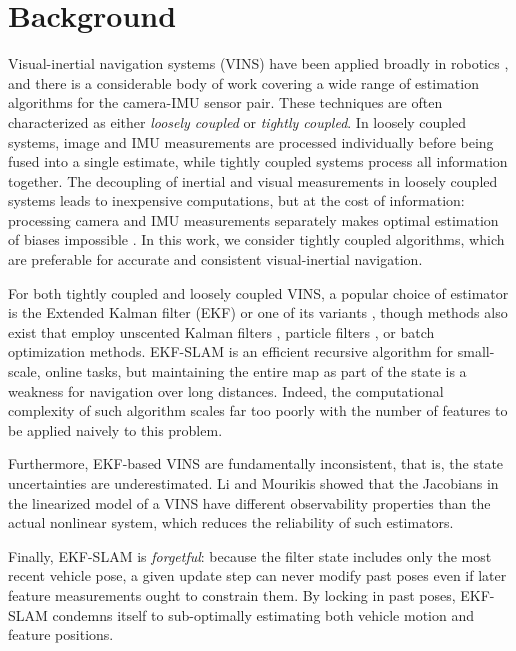 \documentclass[letterpaper, 10 pt, conference]{ieeeconf}  %
\begin{document}
\section{Background} \label{sec:relatedwork}

Visual-inertial navigation systems (VINS) have been applied broadly in robotics \cite{Mourikis:2007:ICRA, Sibley:2010:JFR, Huster:2002:OC, Kottas:2013:IROS, Kim:2007:RSS, Li:2013coa,  You:2001:VR}, and there is a considerable body of work covering a wide range of estimation algorithms for the camera-IMU sensor pair. 
These techniques are often characterized as either \textit{loosely coupled} or \textit{tightly coupled}.
In loosely coupled systems, image and IMU measurements are processed individually before being fused into a single estimate, while tightly coupled systems process all information together.  
The decoupling of inertial and visual measurements in loosely coupled systems leads to inexpensive computations, but at the cost of information: processing camera and IMU measurements separately makes optimal estimation of biases impossible \cite{Li:2013coa}. 
In this work, we consider tightly coupled algorithms, which are preferable for accurate and consistent visual-inertial navigation. 

For both tightly coupled and loosely coupled VINS, a popular choice of estimator is the Extended Kalman filter (EKF) or one of its variants \cite{Huster:2002:OC, You:2001:VR, Kottas:2013:RSS, Kim:2007:RSS, Mourikis:2007:ICRA}, though methods also exist that employ unscented Kalman filters \cite{Ebcin:2007:ION}, particle filters \cite{Fox:1999:JAIR, Pupilli:2005:BMVC}, or batch optimization methods\cite{Triggs:2000va,Strelow:2004:IJR}. 
EKF-SLAM is an efficient recursive algorithm for small-scale, online tasks, but maintaining the entire map as part of the state is a weakness for navigation over long distances.
Indeed, the computational complexity of such algorithm scales far too poorly with the number of features to be applied naively to this problem.

Furthermore, EKF-based VINS are fundamentally inconsistent, that is, the state uncertainties are underestimated.
Li and Mourikis \cite{Li:2013coa} showed that the Jacobians in the linearized model of a VINS have different observability properties than the actual nonlinear system, which reduces the reliability of such estimators.

Finally, EKF-SLAM is \textit{forgetful}:
because the filter state includes only the most recent vehicle pose, a given update step can never modify past poses even if later feature measurements ought to constrain them.
By locking in past poses, EKF-SLAM condemns itself to sub-optimally estimating both vehicle motion and feature positions.
\end{document}
